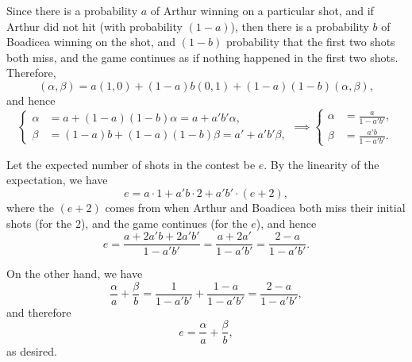 Since there is a probability \(a\) of Arthur winning on a particular shot, and if Arthur did not hit (with probability \((1 - a)\)), then there is a probability \(b\) of Boadicea winning on the shot, and \((1 - b)\) probability that the first two shots both miss, and the game continues as if nothing happened in the first two shots. Therefore,
\[
    (\alpha, \beta) = a (1, 0) + (1 - a) b (0, 1) + (1 - a)(1 - b) (\alpha, \beta),
\]
and hence
\[
    \left\{
    \begin{aligned}
        \alpha & = a + (1 - a)(1 - b) \alpha = a + a' b' \alpha,        \\
        \beta  & = (1 - a) b + (1 - a)(1 - b) \beta = a' + a' b' \beta,
    \end{aligned}
    \right.
    \implies
    \left\{
    \begin{aligned}
        \alpha & = \frac{a}{1 - a' b'},    \\
        \beta  & = \frac{a' b}{1 - a' b'}.
    \end{aligned}
    \right.
\]

Let the expected number of shots in the contest be \(e\). By the linearity of the expectation, we have
\[
    e = a \cdot 1 + a' b \cdot 2 + a' b' \cdot (e + 2),
\]
where the \((e + 2)\) comes from when Arthur and Boadicea both miss their initial shots (for the \(2\)), and the game continues (for the \(e\)), and hence
\[
    e = \frac{a + 2a'b + 2a' b'}{1 - a' b'} = \frac{a + 2a'}{1 - a' b'} = \frac{2 - a}{1 - a' b'}.
\]

On the other hand, we have
\[
    \frac{\alpha}{a} + \frac{\beta}{b} = \frac{1}{1 - a' b'} + \frac{1 - a}{1 - a' b'} = \frac{2 - a}{1 - a' b'},
\]
and therefore
\[
    e = \frac{\alpha}{a} + \frac{\beta}{b},
\]
as desired.